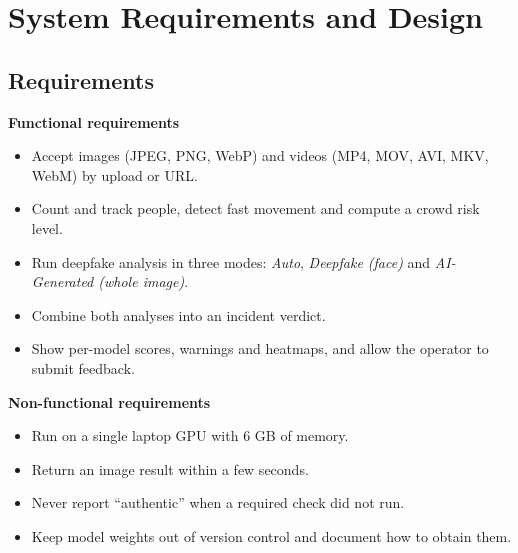 \documentclass[12pt,a4paper,oneside]{report}
\begin{document}
\chapter{System Requirements and Design}

\section{Requirements}
\textbf{Functional requirements}
\begin{itemize}
  \item Accept images (JPEG, PNG, WebP) and videos (MP4, MOV, AVI, MKV, WebM) by upload or URL.
  \item Count and track people, detect fast movement and compute a crowd risk level.
  \item Run deepfake analysis in three modes: \emph{Auto}, \emph{Deepfake (face)} and \emph{AI-Generated (whole image)}.
  \item Combine both analyses into an incident verdict.
  \item Show per-model scores, warnings and heatmaps, and allow the operator to submit feedback.
\end{itemize}

\textbf{Non-functional requirements}
\begin{itemize}
  \item Run on a single laptop GPU with 6 GB of memory.
  \item Return an image result within a few seconds.
  \item Never report ``authentic'' when a required check did not run.
  \item Keep model weights out of version control and document how to obtain them.
\end{itemize}
\end{document}

